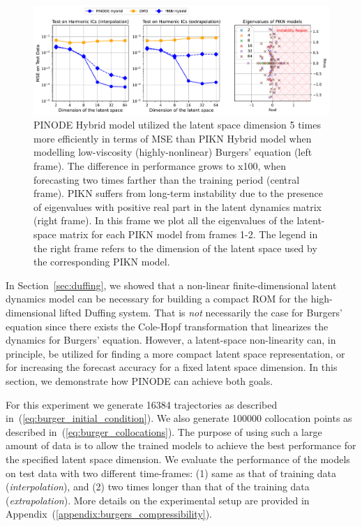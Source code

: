 \label{sec:compressibility}
\begin{figure}[t]
    \centering
    \includegraphics[width=\textwidth]{figures/compressibility.pdf}
    \caption{PINODE Hybrid model utilized the latent space dimension 5 times more efficiently in terms of MSE than PIKN Hybrid model when modelling low-viscosity (highly-nonlinear) Burgers' equation (left frame). The difference in performance grows to x100, when forecasting two times farther than the training period (central frame). PIKN suffers from long-term instability due to the presence of eigenvalues with positive real part in the latent dynamics matrix (right frame). In this frame we plot all the eigenvalues of the latent-space matrix for each PIKN model from frames 1-2. The legend in the right frame refers to the dimension of the latent space used by the corresponding PIKN model.}
    \label{fig:burgers_compressibility}
\end{figure}

In Section~\ref{sec:duffing}, we showed that a non-linear finite-dimensional latent dynamics model can be necessary for building a compact ROM for the high-dimensional lifted Duffing system. That is \textit{not} necessarily the case for Burgers' equation since there exists the Cole-Hopf transformation that linearizes the dynamics for Burgers' equation. However, a latent-space non-linearity can, in principle, be utilized for finding a more compact latent space representation, or for increasing the forecast accuracy for a fixed latent space dimension. In this section, we demonstrate how PINODE can achieve both goals. 

For this experiment we generate 16384 trajectories as described in~(\ref{eq:burger_initial_condition}). We also generate 100000 collocation points as described in~(\ref{eq:burger_collocations}). The purpose of using such a large amount of data is to allow the trained models to achieve the best performance for the specified latent space dimension. We evaluate the performance of the models on test data with two different time-frames: (1) same as that of training data (\textit{interpolation}), and (2) two times longer than that of the training data (\textit{extrapolation}). More details on the experimental setup are provided in Appendix~(\ref{appendix:burgers_compressibility}).

